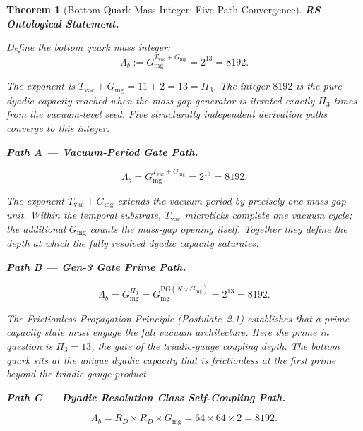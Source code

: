 \documentclass[11pt, letterpaper]{article}
\theoremstyle{definition}
\theoremstyle{plain}
\newtheorem{theorem}{Theorem}[section]
\begin{document}
\begin{theorem}[Bottom Quark Mass Integer: Five-Path Convergence]

\textbf{RS Ontological Statement.}

Define the bottom quark mass integer:
\begin{equation}
    \Lambda_b := G_\mathrm{mg}^{T_\mathrm{vac} + G_\mathrm{mg}} = 2^{13} = 8192.
\end{equation}

The exponent is $T_\mathrm{vac} + G_\mathrm{mg} = 11 + 2 = 13 = \Pi_3$. The integer
$8192$ is the pure dyadic capacity reached when the mass-gap generator is iterated
exactly $\Pi_3$ times from the vacuum-level seed. Five structurally independent derivation
paths converge to this integer.

\medskip
\noindent\textbf{Path A — Vacuum-Period Gate Path.}

\begin{equation}
    \Lambda_b = G_\mathrm{mg}^{T_\mathrm{vac} + G_\mathrm{mg}} = 2^{13} = 8192.
\end{equation}

The exponent $T_\mathrm{vac} + G_\mathrm{mg}$ extends the vacuum period by precisely one
mass-gap unit. Within the temporal substrate, $T_\mathrm{vac}$ microticks complete one
vacuum cycle; the additional $G_\mathrm{mg}$ counts the mass-gap opening itself. Together
they define the depth at which the fully resolved dyadic capacity saturates.

\medskip
\noindent\textbf{Path B — Gen-3 Gate Prime Path.}

\begin{equation}
    \Lambda_b = G_\mathrm{mg}^{\Pi_3} = G_\mathrm{mg}^{\mathrm{PG}(N \times G_\mathrm{mg})}
              = 2^{13} = 8192.
\end{equation}

The Frictionless Propagation Principle (Postulate~2.1) establishes that a prime-capacity
state must engage the full vacuum architecture. Here the prime in question is $\Pi_3 = 13$,
the gate of the triadic-gauge coupling depth. The bottom quark sits at the unique dyadic
capacity that is frictionless at the first prime beyond the triadic-gauge product.

\medskip
\noindent\textbf{Path C — Dyadic Resolution Class Self-Coupling Path.}

\begin{equation}
    \Lambda_b = R_D \times R_D \times G_\mathrm{mg} = 64 \times 64 \times 2 = 8192.
\end{equation}


\end{theorem}
\end{document}
